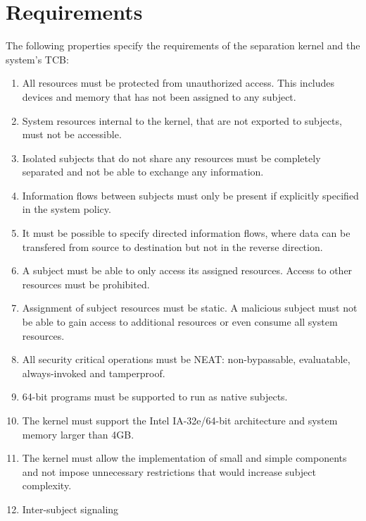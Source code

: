 \section{Requirements}

The following properties specify the requirements of the separation kernel and
the system's TCB:
\begin{enumerate}
	\item All resources must be protected from unauthorized access. This
		includes devices and memory that has not been assigned to any subject.
	\item System resources internal to the kernel, that are not exported to
		subjects, must not be accessible.
	\item Isolated subjects that do not share any resources must be completely
		separated and not be able to exchange any information.
	\item Information flows between subjects must only be present if explicitly
		specified in the system policy.
	\item It must be possible to specify directed information flows, where data
		can be transfered from source to destination but not in the reverse
		direction.
	\item A subject must be able to only access its assigned resources. Access
		to other resources must be prohibited.
	\item Assignment of subject resources must be static. A malicious subject
		must not be able to gain access to additional resources or even consume
		all system resources.
	\item All security critical operations must be NEAT: non-bypassable,
		evaluatable, always-invoked and tamperproof.
	\item 64-bit programs must be supported to run as native subjects.
	\item The kernel must support the Intel IA-32e/64-bit architecture and
		system memory larger than 4GB.
	\item The kernel must allow the implementation of small and simple
		components and not impose unnecessary restrictions that would increase
		subject complexity.
	\item Inter-subject signaling
\end{enumerate}

